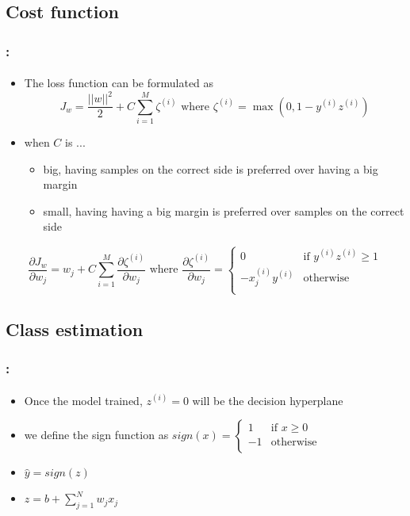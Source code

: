 \documentclass[xcolor=table]{beamer}
\begin{document}
\subsection{Cost function}

\begin{frame}
	\frametitle{\insertshortsubtitle: \insertsection}
	\framesubtitle{\insertsubsection}
	
	\begin{itemize}
		\item The loss function can be formulated as 
		\[J_w = \frac{||w||^2}{2}  +  C \sum_{i=1}^{M} \zeta^{(i)} \text{ where } \zeta^{(i)} = \max (0, 1 - y^{(i)} z^{(i)}) \]
		\item when $ C $ is ...
		\begin{itemize}
			\item big, having samples on the correct side is preferred over having a big margin
			\item small, having having a big margin is preferred over samples on the correct side
		\end{itemize}
	\end{itemize}
	
	\[\frac{\partial J_w}{\partial w_{j}} = w_j + C \sum\limits_{i=1}^{M} \frac{\partial \zeta^{(i)}}{\partial w_{j}} \text{ where }  
	\frac{\partial \zeta^{(i)}}{\partial w_{j}} =
	\begin{cases}
		0 & \text{if } y^{(i)} z^{(i)} \ge 1\\
		- x^{(i)}_j y^{(i)} & \text{otherwise}  \\
	\end{cases}\]
	
\end{frame}

\subsection{Class estimation}

\begin{frame}
	\frametitle{\insertshortsubtitle: \insertsection}
	\framesubtitle{\insertsubsection}
	
	\begin{itemize}
		\item Once the model trained, $ z^{(i)} = 0 $ will be the decision hyperplane
		\item we define the sign function as $ sign(x) = \begin{cases}
			1 & \text{if } x \ge 0\\
			-1 & \text{otherwise}\\
		\end{cases} $
		\item $ \hat{y} = sign(z)$
		\item $ z = b + \sum_{j=1}^{N} w_j x_j $
	\end{itemize}
	
	
\end{frame}
\end{document}
